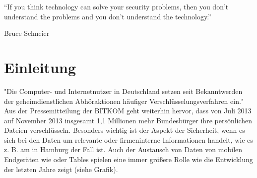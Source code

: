 \documentclass[10pt, a4paper,headsepline]{scrreprt}
\begin{document}
\pagestyle{empty}




\vspace*{\fill}
\begin{center}
“If you think technology can solve your security problems, then you don’t understand the problems and you don’t understand the technology.”
\end{center}
\begin{flushright}
Bruce Schneier
\end{flushright}
\vspace*{\fill}

\clearpage%
\begingroup
  \renewcommand*{\chapterpagestyle}{empty}
  \pagestyle{empty}
  \tableofcontents
  \listoffigures
  \clearpage
\endgroup


\fancyhead[L]{\nouppercase{\leftmark}} %

\chapter{Einleitung}
\setcounter{page}{1}
\pagestyle{fancy}
"Die Computer- und Internetnutzer in Deutschland setzen seit Bekanntwerden der geheimdienstlichen Abhöraktionen häufiger Verschlüsselungsverfahren ein." \cite{website:bitkom-verschl} 
Aus der Pressemitteilung der BITKOM geht weiterhin hervor, dass von Juli 2013 auf November 2013 insgesamt 1,1 Millionen mehr Bundesbürger ihre persönlichen Dateien verschlüsseln. Besonders wichtig ist der Aspekt der Sicherheit, wenn es sich bei den Daten um relevante oder firmeninterne Informationen handelt, wie es z. B. am  in Hamburg der Fall ist. Auch der Austausch von Daten von mobilen Endgeräten wie  oder Tables spielen eine immer größere Rolle wie die Entwicklung der letzten Jahre zeigt (siehe Grafik). \\
\end{document}
